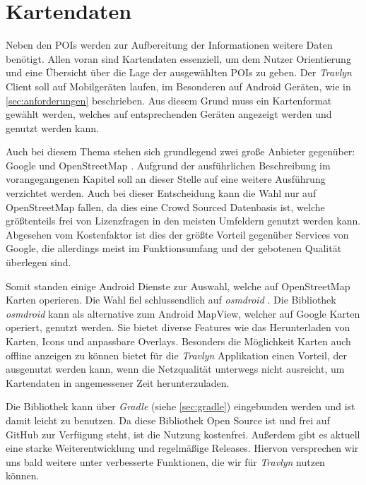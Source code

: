 \section{Kartendaten} \label{sec:osmdroid}

Neben den \acs{POI}s werden zur Aufbereitung der Informationen weitere Daten benötigt. Allen voran sind Kartendaten essenziell, um dem Nutzer Orientierung und eine Übersicht über die Lage der ausgewählten \acs{POI}s zu geben. Der \textit{Travlyn} Client soll auf Mobilgeräten laufen, im Besonderen auf Android Geräten, wie in \autoref{sec:anforderungen} beschrieben. Aus diesem Grund muss ein Kartenformat gewählt werden, welches auf entsprechenden Geräten angezeigt werden und genutzt werden kann.

\vspace{0.25cm}

Auch bei diesem Thema stehen sich grundlegend zwei große Anbieter gegenüber: Google \cite{Google.01.02.2020} und OpenStreetMap \cite{OpenStreetMap.}. Aufgrund der ausführlichen Beschreibung im vorangegangenen Kapitel soll an dieser Stelle auf eine weitere Ausführung verzichtet werden. Auch bei dieser Entscheidung kann die Wahl nur auf OpenStreetMap fallen, da dies eine Crowd Sourced Datenbasis ist, welche größtenteils frei von Lizenzfragen in den meisten Umfeldern genutzt werden kann. Abgesehen vom Kostenfaktor ist dies der größte Vorteil gegenüber Services von Google, die allerdings meist im Funktionsumfang und der gebotenen Qualität überlegen sind.

\vspace{0.25cm}

Somit standen einige Android Dienste zur Auswahl, welche auf OpenStreetMap Karten operieren. Die Wahl fiel schlussendlich auf \textit{osmdroid} \cite{osmdroid.3162020}. Die Bibliothek \textit{osmdroid} kann als alternative zum Android MapView, welcher auf Google Karten operiert, genutzt werden. Sie bietet diverse Features wie das Herunterladen von Karten, Icons und anpassbare Overlays. Besonders die Möglichkeit Karten auch offline anzeigen zu können bietet für die \textit{Travlyn} Applikation einen Vorteil, der ausgenutzt werden kann, wenn die Netzqualität unterwegs nicht ausreicht, um Kartendaten in angemessener Zeit herunterzuladen.

\vspace{0.25cm}

Die Bibliothek kann über \textit{Gradle} (siehe \autoref{sec:gradle}) eingebunden werden und ist damit leicht zu benutzen. Da diese Bibliothek Open Source ist und frei auf GitHub zur Verfügung steht, ist die Nutzung kostenfrei. Außerdem gibt es aktuell eine starke Weiterentwicklung und regelmäßige Releases. Hiervon versprechen wir uns bald weitere unter verbesserte Funktionen, die wir für \textit{Travlyn} nutzen können.